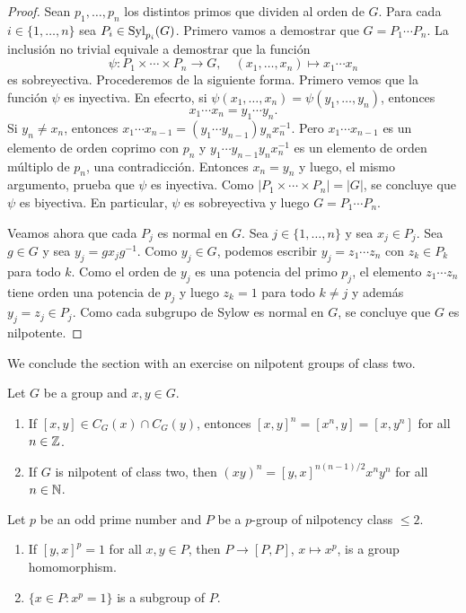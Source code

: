 \begin{proof}
	Sean $p_1,\dots,p_n$ los distintos primos que dividen al orden de $G$. Para cada
	$i\in\{1,\dots,n\}$ sea $P_i\in\mathrm{Syl}_{p_i}(G)$.  Primero vamos a demostrar
	que $G=P_1\cdots P_n$. La inclusión no trivial equivale a 
	demostrar que la función 
	\[
		\psi\colon P_1\times\cdots\times P_n\to G,\quad
		(x_1,\dots,x_n)\mapsto x_1\cdots x_n
	\]
	es sobreyectiva. Procederemos de la siguiente forma. Primero vemos que  
	la función $\psi$ es inyectiva. En efecrto, si
	$\psi(x_1,\dots,x_n)=\psi(y_1,\dots,y_n)$, entonces 
	\[
		x_1\cdots
	x_n=y_1\cdots y_n. 
	\]
	Si $y_n\ne x_n$, entonces $x_1\cdots x_{n-1}=(y_1\cdots
	y_{n-1})y_nx_n^{-1}$. Pero $x_1\cdots x_{n-1}$ es un elemento de orden
	coprimo con $p_n$ y $y_1\cdots y_{n-1}y_nx_n^{-1}$ es un elemento de orden
	múltiplo de $p_n$, una contradicción. Entonces $x_n=y_n$ y luego, el mismo
	argumento, prueba que $\psi$ es inyectiva. Como $|P_1\times\cdots\times
	P_n|=|G|$, se concluye que $\psi$ es biyectiva. En particular, $\psi$ es sobreyectiva
	y luego $G=P_1\cdots P_n$.

	Veamos ahora que cada $P_j$ es normal en $G$.  Sea $j\in\{1,\dots,n\}$ y
	sea $x_j\in P_j$. Sea $g\in G$ y sea $y_j=gx_jg^{-1}$.  Como $y_j\in G$,
	podemos escribir $y_j=z_1\cdots z_n$ con $z_k\in P_k$ para todo $k$.  Como
	el orden de $y_j$ es una potencia del primo $p_j$, el elemento $z_1\cdots
	z_n$ tiene orden una potencia de $p_j$ y luego $z_k=1$ para todo $k\ne j$ y
	además $y_j=z_j\in P_j$. Como cada subgrupo de Sylow es normal en $G$, se
	concluye que $G$ es nilpotente.
\end{proof}


We conclude the section with an exercise
on nilpotent groups of class two. 

\begin{exercise}
Let $G$ be a group and $x,y\in G$.  
\begin{enumerate}
	\item If $[x,y]\in C_G(x)\cap C_G(y)$, entonces
	$[x,y]^n=[x^n,y]=[x,y^n]$
	for all $n\in\mathbb{Z}$.
	\item If $G$ is nilpotent of class two, then $(xy)^n=[y,x]^{n(n-1)/2}x^ny^n$ 
	for all $n\in\mathbb{N}$.
\end{enumerate}	
\end{exercise}

\begin{exercise}
	Let $p$ be an odd prime number and  
	$P$ be a $p$-group of nilpotency class $\leq2$. 
	\begin{enumerate}
	\item 	If $[y,x]^p=1$ for all $x,y\in P$, then $P\to [P,P]$,
	$x\mapsto x^p$, is a group homomorphism. 
	\item $\{x\in P:x^p=1\}$ is a subgroup of $P$. 
	\end{enumerate}
\end{exercise}





